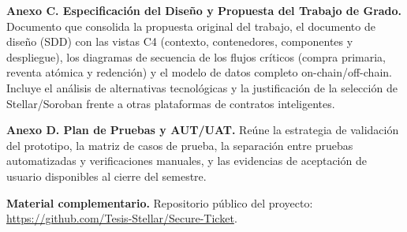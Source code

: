\textbf{Anexo C. Especificación del Diseño y Propuesta del Trabajo de Grado.} Documento que consolida la
propuesta original del trabajo, el documento de diseño (SDD) con las vistas C4 (contexto, contenedores,
componentes y despliegue), los diagramas de secuencia de los flujos críticos (compra primaria, reventa
atómica y redención) y el modelo de datos completo on-chain/off-chain. Incluye el análisis de alternativas
tecnológicas y la justificación de la selección de Stellar/Soroban frente a otras plataformas de contratos
inteligentes.

\textbf{Anexo D. Plan de Pruebas y AUT/UAT.} Reúne la estrategia de validación del prototipo, la matriz de
casos de prueba, la separación entre pruebas automatizadas y verificaciones manuales, y las evidencias de
aceptación de usuario disponibles al cierre del semestre.

\textbf{Material complementario.} Repositorio público del proyecto:
\url{https://github.com/Tesis-Stellar/Secure-Ticket}.
